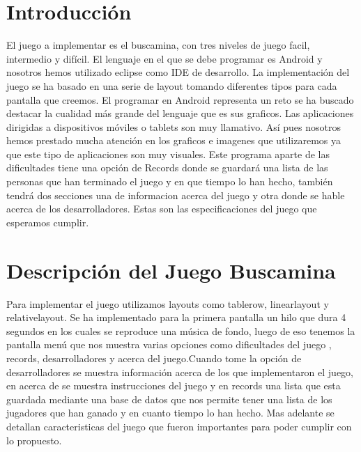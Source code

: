 \vspace*{\fill}
\newpage 


\section{Introducción}
El juego a implementar es el buscamina, con tres niveles de juego facil, intermedio y difícil. El lenguaje en el que se debe programar  es Android y nosotros hemos utilizado eclipse como IDE de desarrollo. La implementación del juego se ha basado en una serie de layout tomando diferentes tipos para cada pantalla que creemos. El programar en Android representa un reto se ha buscado destacar la cualidad más grande del lenguaje que es sus graficos. Las aplicaciones dirigidas a dispositivos móviles o tablets son muy llamativo. Así pues nosotros hemos prestado mucha atención en los graficos e imagenes que utilizaremos ya que este tipo de aplicaciones son muy visuales. Este programa aparte de las dificultades tiene una opción de Records donde se guardará una lista de las personas que han terminado el juego y en que tiempo lo han hecho, también tendrá dos secciones una de informacion acerca del juego y otra donde se hable acerca de los desarrolladores. Estas son las especificaciones del juego que esperamos  cumplir.

\section{Descripción del Juego Buscamina}
Para implementar el juego utilizamos layouts como tablerow, linearlayout y relativelayout. Se ha implementado para la primera pantalla un hilo que dura 4 segundos en los cuales se reproduce una música de fondo, luego de eso tenemos la pantalla menú que nos muestra varias opciones como dificultades del juego , records, desarrolladores y acerca del juego.Cuando tome la opción de desarrolladores se muestra información acerca de los que implementaron el juego, en acerca de se muestra instrucciones del juego y en records una lista que esta guardada mediante una base de datos que nos permite tener una lista de los jugadores que han ganado y en cuanto tiempo lo han hecho. Mas adelante se detallan caracteristicas del juego que fueron importantes para poder cumplir con lo propuesto.

